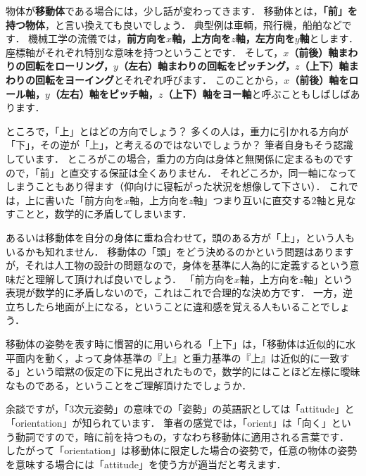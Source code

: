 ﻿\documentclass[a4paper]{jsarticle}
\begin{document}
物体が{\bf 移動体}である場合には，少し話が変わってきます．
移動体とは，{\bf 「前」を持つ物体}，と言い換えても良いでしょう．
典型例は車輌，飛行機，船舶などです．
機械工学の流儀では，{\bf 前方向を$x$軸，上方向を$z$軸，左方向を$y$軸}とします．
座標軸がそれぞれ特別な意味を持つということです．
そして，{\bf $x$（前後）軸まわりの回転をローリング，$y$（左右）軸まわりの回転をピッチング，$z$（上下）軸まわりの回転をヨーイング}とそれぞれ呼びます．
このことから，{\bf $x$（前後）軸をロール軸，$y$（左右）軸をピッチ軸，$z$（上下）軸をヨー軸}と呼ぶこともしばしばあります．

\begin{figure*}[h]
\begin{center}

\end{center}
\end{figure*}

ところで，「上」とはどの方向でしょう？
多くの人は，重力に引かれる方向が「下」，その逆が「上」，と考えるのではないでしょうか？
筆者自身もそう認識しています．
ところがこの場合，重力の方向は身体と無関係に定まるものですので，「前」と直交する保証は全くありません．
それどころか，同一軸になってしまうこともあり得ます（仰向けに寝転がった状況を想像して下さい）．
これでは，上に書いた「前方向を$x$軸，上方向を$z$軸」つまり互いに直交する2軸と見なすことと，数学的に矛盾してしまいます．

あるいは移動体を自分の身体に重ね合わせて，頭のある方が「上」，という人もいるかも知れません．
移動体の「頭」をどう決めるのかという問題はありますが，それは人工物の設計の問題なので，身体を基準に人為的に定義するという意味だと理解して頂ければ良いでしょう．
「前方向を$x$軸，上方向を$z$軸」という表現が数学的に矛盾しないので，これはこれで合理的な決め方です．
一方，逆立ちしたら地面が上になる，ということに違和感を覚える人もいることでしょう．

移動体の姿勢を表す時に慣習的に用いられる「上下」は，「移動体は近似的に水平面内を動く，よって身体基準の『上』と重力基準の『上』は近似的に一致する」という暗黙の仮定の下に見出されたもので，数学的にはことほど左様に曖昧なものである，ということをご理解頂けたでしょうか．

余談ですが，「3次元姿勢」の意味での「姿勢」の英語訳としては「attitude」と「orientation」が知られています．
筆者の感覚では，「orient」は「向く」という動詞ですので，暗に前を持つもの，すなわち移動体に適用される言葉です．
したがって「orientation」は移動体に限定した場合の姿勢で，任意の物体の姿勢を意味する場合には「attitude」を使う方が適当だと考えます．
\end{document}
